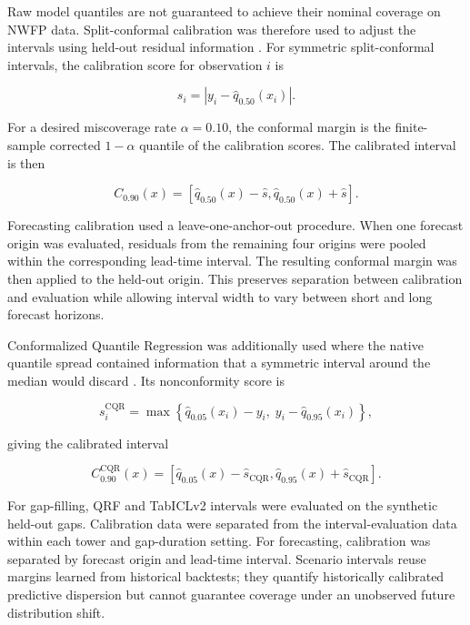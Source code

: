 Raw model quantiles are not guaranteed to achieve their nominal coverage on
NWFP data. Split-conformal calibration was therefore used to adjust the
intervals using held-out residual information
\cite{lei2018distributionfree}.
For symmetric split-conformal intervals, the calibration score for observation
\(i\) is

\begin{equation}
s_i
=
\left|
y_i-\hat{q}_{0.50}(x_i)
\right|.
\end{equation}

For a desired miscoverage rate \(\alpha=0.10\), the conformal margin is the
finite-sample corrected \(1-\alpha\) quantile of the calibration scores. The
calibrated interval is then

\begin{equation}
C_{0.90}(x)
=
\left[
\hat{q}_{0.50}(x)-\hat{s},
\hat{q}_{0.50}(x)+\hat{s}
\right].
\end{equation}

Forecasting calibration used a leave-one-anchor-out procedure. When one
forecast origin was evaluated, residuals from the remaining four origins were
pooled within the corresponding lead-time interval. The resulting conformal
margin was then applied to the held-out origin. This preserves separation
between calibration and evaluation while allowing interval width to vary
between short and long forecast horizons.

Conformalized Quantile Regression was additionally used where the native
quantile spread contained information that a symmetric interval around the
median would discard \cite{romano2019cqr}. Its nonconformity score is

\begin{equation}
s_i^{\mathrm{CQR}}
=
\max\left\{
\hat{q}_{0.05}(x_i)-y_i,\;
y_i-\hat{q}_{0.95}(x_i)
\right\},
\end{equation}

giving the calibrated interval

\begin{equation}
C^{\mathrm{CQR}}_{0.90}(x)
=
\left[
\hat{q}_{0.05}(x)-\hat{s}_{\mathrm{CQR}},
\hat{q}_{0.95}(x)+\hat{s}_{\mathrm{CQR}}
\right].
\end{equation}

For gap-filling, QRF and TabICLv2 intervals were evaluated on the synthetic
held-out gaps. Calibration data were separated from the interval-evaluation
data within each tower and gap-duration setting. For forecasting, calibration
was separated by forecast origin and lead-time interval. Scenario intervals
reuse margins learned from historical backtests; they quantify historically
calibrated predictive dispersion but cannot guarantee coverage under an
unobserved future distribution shift.

